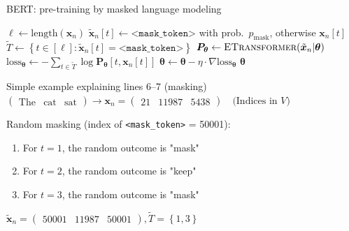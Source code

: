 \documentclass[12pt,aspectratio=169,handout]{beamer}
\begin{document}
\begin{frame}{BERT: pre-training by masked language modeling}
	
	\vspace{-2em}	
	\begin{minipage}[t][10cm][t]{15cm}
		\begin{algorithmic}[1]
			\State $\ell \gets \text{length}(\bm{x}_n)$
			\State $\tilde{\bm{x}}_n[t] \gets \texttt{<mask\_token>}$ with prob.\ $p_{\text{mask}}$, otherwise $\bm{x}_n[t]$
			\EndFor
			\State $\tilde{T} \gets \left\{ t \in [\ell] : \tilde{\bm{x}}_n[t] = \texttt{<mask\_token>} \right\}$
			\State $\bm{P_{\theta}} \gets \textsc{ETransformer}(\tilde{\bm{x}}_n | \bm{\theta})$
			\State $\text{loss}_{\bm{\theta}} \gets - \sum_{t \in \tilde{T}} \log \bm{P_{\theta}} [t, \bm{x}_n[t]] $
			\State $\bm{\theta} \gets \bm{\theta} - \eta \cdot \nabla \text{loss}_{\bm{\theta}}$
			\EndFor
			\EndFor
			\State \Return $\bm{\theta}$
			\EndFunction
		\end{algorithmic}
		
	\end{minipage}
\end{frame}




\begin{frame}{Simple example explaining lines 6--7 (masking)}
	$
	\begin{pmatrix}
		\text{The} &
		\text{cat} &
		\text{sat}
	\end{pmatrix}
	\rightarrow
	\bm{x}_n =
	\begin{pmatrix}
		21 &
		11987 &
		5438
	\end{pmatrix}
	\quad \text{(Indices in $V$)}
	$
	
	Random masking (index of \texttt{<mask\_token>} = 50001):
	\begin{enumerate}
		\item For $t = 1$, the random outcome is "mask"
		\item For $t = 2$, the random outcome is "keep"
		\item For $t = 3$, the random outcome is "mask"
	\end{enumerate}
	$
	\bm{\tilde{x}}_n =
	\begin{pmatrix}
		50001 &
		11987 &
		50001
	\end{pmatrix},
	\tilde{T} = \left\{ 1, 3 \right\}
	$
	
	
	
\end{frame}
\end{document}
